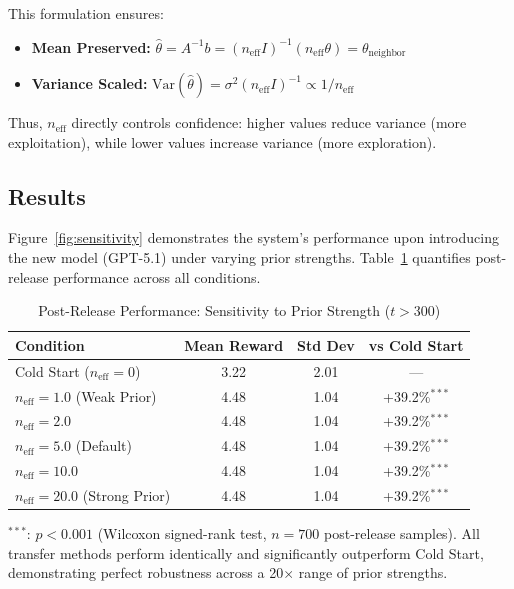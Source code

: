 This formulation ensures:
\begin{itemize}[leftmargin=*,noitemsep]
    \item \textbf{Mean Preserved:} $\hat{\theta} = A^{-1}b = (n_{\text{eff}} I)^{-1}(n_{\text{eff}} \theta) = \theta_{\text{neighbor}}$
    \item \textbf{Variance Scaled:} $\text{Var}(\hat{\theta}) = \sigma^2 (n_{\text{eff}} I)^{-1} \propto 1/n_{\text{eff}}$
\end{itemize}

Thus, $n_{\text{eff}}$ directly controls confidence: higher values reduce variance 
(more exploitation), while lower values increase variance (more exploration).

\subsection{Results}

Figure~\ref{fig:sensitivity} demonstrates the system's performance upon introducing 
the new model (GPT-5.1) under varying prior strengths. Table~\ref{tab:sensitivity_appendix} 
quantifies post-release performance across all conditions.

\begin{table}[h]
\centering
\caption{Post-Release Performance: Sensitivity to Prior Strength ($t > 300$)}
\label{tab:sensitivity_appendix}
\begin{tabular}{lccc}
\toprule
\textbf{Condition} & \textbf{Mean Reward} & \textbf{Std Dev} & \textbf{vs Cold Start} \\
\midrule
Cold Start ($n_{\text{eff}}=0$) & 3.22 & 2.01 & --- \\
\midrule
$n_{\text{eff}}=1.0$ (Weak Prior) & 4.48 & 1.04 & +39.2\%$^{***}$ \\
$n_{\text{eff}}=2.0$ & 4.48 & 1.04 & +39.2\%$^{***}$ \\
$n_{\text{eff}}=5.0$ (Default) & 4.48 & 1.04 & +39.2\%$^{***}$ \\
$n_{\text{eff}}=10.0$ & 4.48 & 1.04 & +39.2\%$^{***}$ \\
$n_{\text{eff}}=20.0$ (Strong Prior) & 4.48 & 1.04 & +39.2\%$^{***}$ \\
\bottomrule
\end{tabular}
\vspace{0.5em}

\footnotesize
$^{***}$: $p < 0.001$ (Wilcoxon signed-rank test, $n=700$ post-release samples). 
All transfer methods perform identically and significantly outperform Cold Start, 
demonstrating perfect robustness across a 20$\times$ range of prior strengths.
\end{table}


